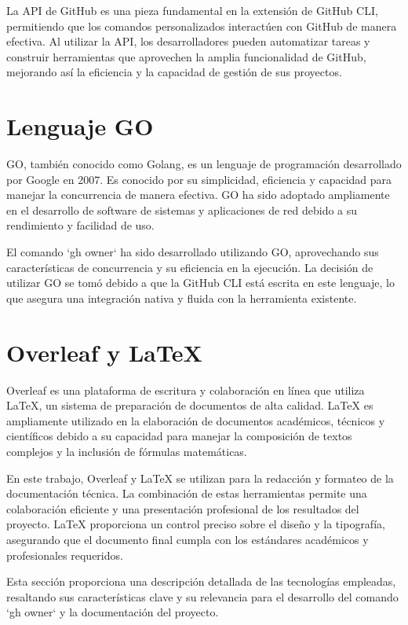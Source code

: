 La API de GitHub es una pieza fundamental en la extensión de GitHub CLI, permitiendo que los comandos personalizados interactúen con GitHub de manera efectiva. Al utilizar la API, los desarrolladores pueden automatizar tareas y construir herramientas que aprovechen la amplia funcionalidad de GitHub, mejorando así la eficiencia y la capacidad de gestión de sus proyectos.

\section{Lenguaje GO}
GO, también conocido como Golang, es un lenguaje de programación desarrollado por Google en 2007. Es conocido por su simplicidad, eficiencia y capacidad para manejar la concurrencia de manera efectiva. GO ha sido adoptado ampliamente en el desarrollo de software de sistemas y aplicaciones de red debido a su rendimiento y facilidad de uso.

El comando `gh owner` ha sido desarrollado utilizando GO, aprovechando sus características de concurrencia y su eficiencia en la ejecución. La decisión de utilizar GO se tomó debido a que la GitHub CLI está escrita en este lenguaje, lo que asegura una integración nativa y fluida con la herramienta existente.

\section{Overleaf y LaTeX}
Overleaf es una plataforma de escritura y colaboración en línea que utiliza LaTeX, un sistema de preparación de documentos de alta calidad. LaTeX es ampliamente utilizado en la elaboración de documentos académicos, técnicos y científicos debido a su capacidad para manejar la composición de textos complejos y la inclusión de fórmulas matemáticas.

En este trabajo, Overleaf y LaTeX se utilizan para la redacción y formateo de la documentación técnica. La combinación de estas herramientas permite una colaboración eficiente y una presentación profesional de los resultados del proyecto. LaTeX proporciona un control preciso sobre el diseño y la tipografía, asegurando que el documento final cumpla con los estándares académicos y profesionales requeridos.

Esta sección proporciona una descripción detallada de las tecnologías empleadas, resaltando sus características clave y su relevancia para el desarrollo del comando `gh owner` y la documentación del proyecto.